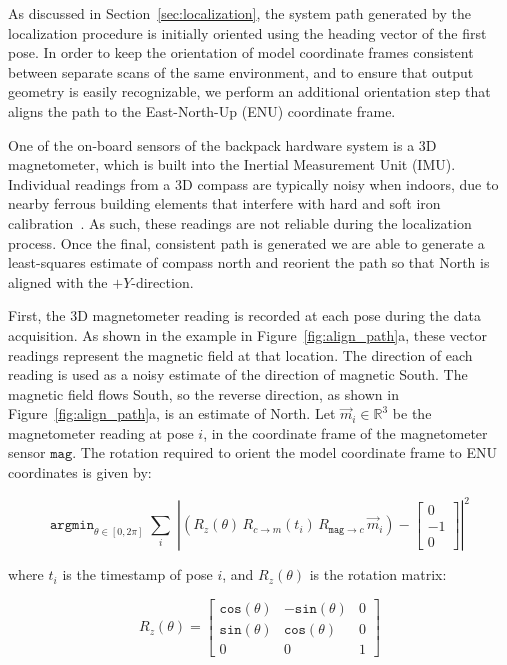\documentclass[12pt,onecolumn,oneside]{book}
\begin{document}
As discussed in Section~\ref{sec:localization}, the system path generated by the localization procedure is initially oriented using the heading vector of the first pose.  In order to keep the orientation of model coordinate frames consistent between separate scans of the same environment, and to ensure that output geometry is easily recognizable, we perform an additional orientation step that aligns the path to the East-North-Up (ENU) coordinate frame.

One of the on-board sensors of the backpack hardware system is a 3D magnetometer, which is built into the Inertial Measurement Unit (IMU).  Individual readings from a 3D compass are typically noisy when indoors, due to nearby ferrous building elements that interfere with hard and soft iron calibration~\cite{Caruso00,Guo08}.  As such, these readings are not reliable during the localization process.  Once the final, consistent path is generated we are able to generate a least-squares estimate of compass north and reorient the path so that North is aligned with the $+Y$-direction.

First, the 3D magnetometer reading is recorded at each pose during the data acquisition.  As shown in the example in Figure~\ref{fig:align_path}a, these vector readings represent the magnetic field at that location.  The direction of each reading is used as a noisy estimate of the direction of magnetic South.  The magnetic field flows South, so the reverse direction, as shown in Figure~\ref{fig:align_path}a, is an estimate of North.  Let $\vec{m}_i \in \mathbb{R}^3$ be the magnetometer reading at pose $i$, in the coordinate frame of the magnetometer sensor $\texttt{mag}$.  The rotation required to orient the model coordinate frame to ENU coordinates is given by:

\begin{equation}
	\label{eq:align_path}
	\texttt{argmin}_{\theta \in [0,2\pi]} \; \sum \limits_{i} 
		\; \left| \left( R_{z}(\theta) \, R_{c\rightarrow m} (t_i) \,
			R_{\texttt{mag} \rightarrow c} \, \vec{m}_i \right) - \left[ 
				\begin{array}{c} 0 \\ -1 \\ 0 \end{array} 
					\right] \right|^2
\end{equation}

where $t_i$ is the timestamp of pose $i$, and $R_{z}(\theta)$ is the rotation matrix:

\begin{equation}
	\label{eq:rotation_matrix}
	R_{z}(\theta) = \left[ \begin{array}{ccc}
				\texttt{cos}(\theta) & -\texttt{sin}(\theta) & 0 \\
				\texttt{sin}(\theta) & \texttt{cos}(\theta) & 0 \\
				0 & 0 & 1 \end{array} \right]
\end{equation}
\end{document}
